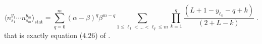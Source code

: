 \documentclass[10pt]{article}
\numberwithin{equation}{section}
\numberwithin{equation}{subsection}
\newcommand{\dt}{\;.}
\begin{document}
\begin{comment}
 introducing $q=\sum_{j=1}^{m}c_{i}$ in the colour-blind situation \eqref{exactCorrelations} becomes
\begin{align}
	\langle n^{y_{1}}_{s_{1}}\cdots n^{y_{m}}_{s_{m}}\rangle_{\text{stat}}=&\sum_{q=0}^{m}(\alpha-\beta)^{q}\beta^{m-q}\frac{\Gamma(L+2-q)}{\Gamma(L+2)}\sum_{c_{1}=0}^{1}\ldots\sum_{c_{m}=0}^{1}\mathbbm{1}_{\{c_{1}+\cdots+c_{m}=q\}}
	\\&\prod_{k=1}^{m}\left(L+2-y_{k}-\sum_{i=k}^{m}c_{i}\right)^{c_{k}}\dt
\end{align}
We observe that, at most $q$ factors do survive in the product over $k$. For any fixed $q$ we must consider all possible values of $(c_{i})_{i\in\{1,\ldots,m\}}$ such that its sum is equal to $q$. For each of these $(c_{i})_{i\in\{1,\ldots,m\}}$ we add a term given by  
\begin{equation}
	\prod_{k=1}^{m}\left(L+2-y_{k}-\sum_{i=k}^{m}c_{i}\right)^{c_{k}}\dt
\end{equation}
We can introduce $\ell_{1},\ldots,\ell_{q}\in\{1,\ldots,m\}$ such that $\ell_{1}<\ell_{2}<\cdots<\ell_{q}$ and write 
\begin{equation}
	\sum_{c_{1}=0}^{1}\ldots\sum_{c_{m}=0}^{1}\mathbbm{1}_{\{c_{1}+\cdots+c_{m}=q\}}\prod_{k=1}^{m}\left(L+2-y_{k}-\sum_{i=k}^{m}c_{i}\right)^{c_{k}}=\sum_{1\leq \ell_{1}<\ldots<\ell_{q}\leq m}\prod_{k=1}^{q}\left(L+2-y_{\ell_{k}}-(q-k+1)\right)\dt
\end{equation}
Moreover, we observe that 
\begin{equation}
	\frac{\Gamma(L+2-q)}{\Gamma(2+L)}=\prod_{k=1}^{q}\frac{1}{(2+L-k)}\dt
\end{equation}
All in all we have that
\end{comment}
\begin{equation}
\langle n^{y_{1}}_{s_{1}}\cdots n^{y_{m}}_{s_{m}}\rangle_{\text{stat}}=\sum_{q=0}^{m}(\alpha-\beta)^{q}\beta^{m-q}\sum_{1\leq \ell_{1}<\ldots<\ell_{q}\leq m}\prod_{k=1}^{q}\frac{\left(L+1-y_{\ell_{k}}-q+k\right)}{(2+L-k)}\dt
\end{equation}
that is exactly equation (4.26) of \cite{frassek2020eigenstates}.
\end{document}
